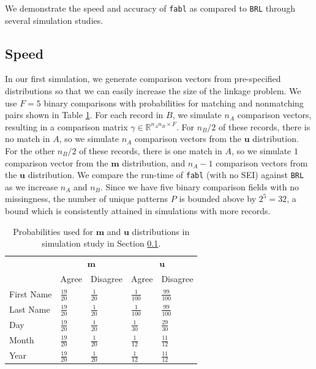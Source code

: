 \documentclass[ba]{imsart}
\begin{document}
	We demonstrate the speed and accuracy of \texttt{fabl} as compared to \texttt{BRL} through several simulation studies. 
	
	\hypertarget{speed}{%
		\subsection{Speed}\label{speed}}
	
	In our first simulation, we generate comparison vectors from pre-specified distributions so that we can easily increase the size of the linkage problem. We use $F = 5$ binary comparisons with probabilities for matching and nonmatching pairs shown in Table \ref{Tab:distributions}. For each record in $B$, we simulate $n_A$ comparison vectors, resulting in a comparison matrix $\gamma \in \mathbb{R}^{n_A n_B \times F}$. For $n_B/2$ of these records, there is no match in $A$, so we simulate $n_A$ comparison vectors from the $\bm{u}$ distribution. For the other $n_B/2$ of these records, there is one match in $A$, so we simulate $1$ comparison vector from the $\bm{m}$ distribution, and $n_A - 1$ comparison vectors from the $\bm{u}$ distribution. We compare the run-time of \texttt{fabl} (with no SEI) against \texttt{BRL} as we increase $n_A$ and $n_B$. Since we have five binary comparison fields with no missingness, the number of unique patterns $P$ is bounded above by $2^5 = 32$, a bound which is consistently attained in simulations with more records.
	

	
	\begin{table}[t]
		\centering
		\begin{tabular}{lll|ll}
			\multicolumn{1}{c}{ } & \multicolumn{2}{c}{$\bm{m}$} & \multicolumn{2}{c}{$\bm{u}$} \\
			\cline{2-3} \cline{4-5}
			& Agree & Disagree & Agree & Disagree \\
			\hline
			First Name & $\frac{19}{20}$ & $\frac{1}{20}$ & $\frac{1}{100}$ &  $\frac{99}{100}$ \\ 
			Last Name & $\frac{19}{20}$ & $\frac{1}{20}$ & $\frac{1}{100}$ &  $\frac{99}{100}$ \\ 
			Day & $\frac{19}{20}$ & $\frac{1}{20}$ & $\frac{1}{30}$ &  $\frac{29}{30}$ \\ 
			Month & $\frac{19}{20}$ & $\frac{1}{20}$ & $\frac{1}{12}$ &  $\frac{11}{12}$ \\ 
			Year & $\frac{19}{20}$ & $\frac{1}{20}$ & $\frac{1}{12}$ &  $\frac{11}{12}$ \\  
			\hline
		\end{tabular}
		\caption{Probabilities used for $\bm{m}$ and $\bm{u}$ distributions in simulation study in Section \ref{speed}.}\label{Tab:distributions}
	\end{table}
	
\end{document}
